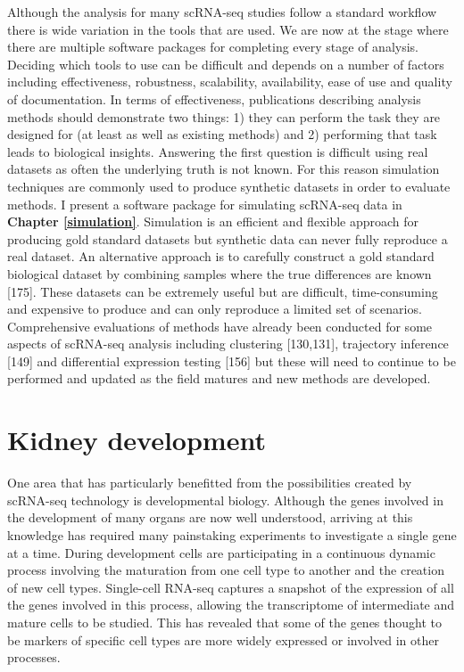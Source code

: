 \documentclass[11pt,a4paper,titlepage,twoside,openright]{style/unimelbthesis}
\theoremstyle{definition}
\theoremstyle{definition}
\theoremstyle{definition}
\theoremstyle{remark}
\begin{document}
\begin{mainmatter}
Although the analysis for many scRNA-seq studies follow a standard workflow there is wide variation in the tools that are used. We are now at the stage where there are multiple software packages for completing every stage of analysis. Deciding which tools to use can be difficult and depends on a number of factors including effectiveness, robustness, scalability, availability, ease of use and quality of documentation. In terms of effectiveness, publications describing analysis methods should demonstrate two things: 1) they can perform the task they are designed for (at least as well as existing methods) and 2) performing that task leads to biological insights. Answering the first question is difficult using real datasets as often the underlying truth is not known. For this reason simulation techniques are commonly used to produce synthetic datasets in order to evaluate methods. I present a software package for simulating scRNA-seq data in \textbf{Chapter \ref{simulation}}. Simulation is an efficient and flexible approach for producing gold standard datasets but synthetic data can never fully reproduce a real dataset. An alternative approach is to carefully construct a gold standard biological dataset by combining samples where the true differences are known {[}175{]}. These datasets can be extremely useful but are difficult, time-consuming and expensive to produce and can only reproduce a limited set of scenarios. Comprehensive evaluations of methods have already been conducted for some aspects of scRNA-seq analysis including clustering {[}130,131{]}, trajectory inference {[}149{]} and differential expression testing {[}156{]} but these will need to continue to be performed and updated as the field matures and new methods are developed.

\hypertarget{intro-kidney}{%
\section{Kidney development}\label{intro-kidney}}

One area that has particularly benefitted from the possibilities created by scRNA-seq technology is developmental biology. Although the genes involved in the development of many organs are now well understood, arriving at this knowledge has required many painstaking experiments to investigate a single gene at a time. During development cells are participating in a continuous dynamic process involving the maturation from one cell type to another and the creation of new cell types. Single-cell RNA-seq captures a snapshot of the expression of all the genes involved in this process, allowing the transcriptome of intermediate and mature cells to be studied. This has revealed that some of the genes thought to be markers of specific cell types are more widely expressed or involved in other processes.


\end{mainmatter}
\end{document}
